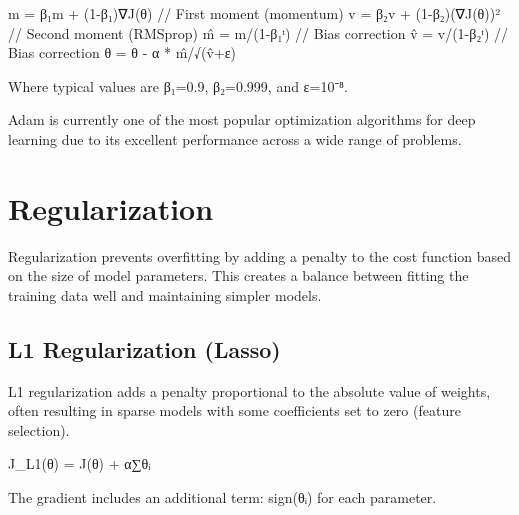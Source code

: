 \documentclass[
  letterpaper,
  DIV=11,
  numbers=noendperiod]{scrreprt}
\begin{document}
m = β₁m + (1-β₁)∇J(θ) // First moment (momentum) v = β₂v +
(1-β₂)(∇J(θ))² // Second moment (RMSprop) m̂ = m/(1-β₁ᵗ) // Bias
correction v̂ = v/(1-β₂ᵗ) // Bias correction θ = θ - α * m̂/√(v̂+ε)

Where typical values are β₁=0.9, β₂=0.999, and ε=10⁻⁸.

Adam is currently one of the most popular optimization algorithms for
deep learning due to its excellent performance across a wide range of
problems.

\section{Regularization}\label{regularization-1}

Regularization prevents overfitting by adding a penalty to the cost
function based on the size of model parameters. This creates a balance
between fitting the training data well and maintaining simpler models.

\subsection{L1 Regularization (Lasso)}\label{l1-regularization-lasso}

L1 regularization adds a penalty proportional to the absolute value of
weights, often resulting in sparse models with some coefficients set to
zero (feature selection).

J\_L1(θ) = J(θ) + α∑\textbar θᵢ\textbar{}

The gradient includes an additional term: sign(θᵢ) for each parameter.
\end{document}
